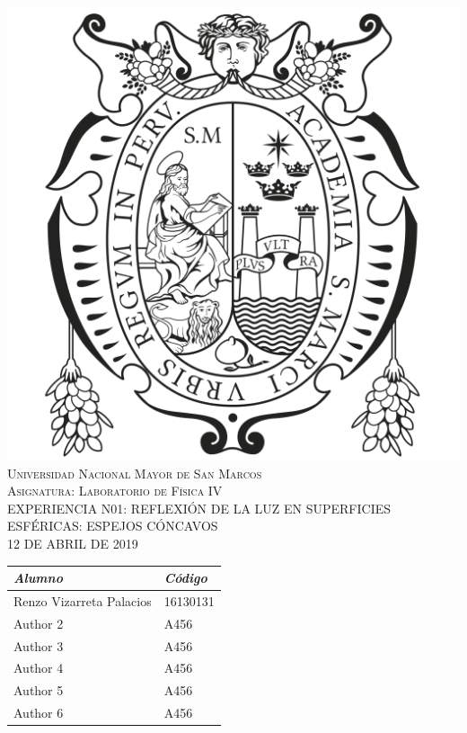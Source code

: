 \documentclass{ucsdreport}
\def\course{Asignatura: Laboratorio de Física IV}      %
\def\thetitle{EXPERIENCIA N01: REFLEXIÓN DE LA LUZ EN SUPERFICIES ESFÉRICAS: ESPEJOS CÓNCAVOS}               %
\def\date{12 DE ABRIL DE 2019}                         %
\begin{document}
\begin{center}
    \vspace*{1.5cm}
    \includegraphics[scale = 0.30]{images/logo.png}\\[1.75cm]
    \textsc{\color[RGB]{0, 51, 102}\LARGE{Universidad Nacional Mayor de San Marcos}}\\[1cm]
    \textsc{\Large{\course}}\\[.5cm]
    \textsc{\Large{\thetitle}}\\[.5cm]
    \textsc{\date}\\[2cm]
    \Large{
    \begin{tabular}{L{6cm} R{4cm}}
        \textit{Alumno} &  \textit{Código}\\
        \hline
        Renzo Vizarreta Palacios & 16130131\\
        Author 2 & A456\\
        Author 3 & A456\\
        Author 4 & A456\\
        Author 5 & A456\\
        Author 6 & A456
    \end{tabular}
    }
\end{center}
\thispagestyle{empty}
\pagebreak
\end{document}
